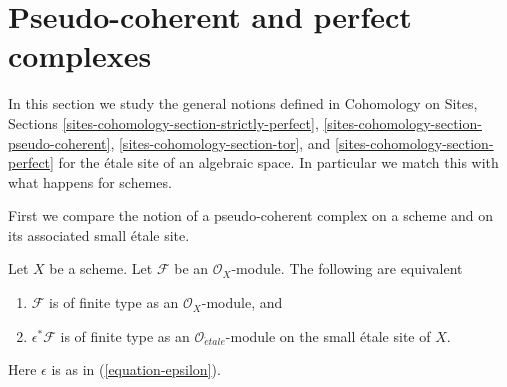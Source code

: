 \section{Pseudo-coherent and perfect complexes}
\label{section-spell-out}

\noindent
In this section we study the general notions defined in
Cohomology on Sites, Sections
\ref{sites-cohomology-section-strictly-perfect},
\ref{sites-cohomology-section-pseudo-coherent},
\ref{sites-cohomology-section-tor}, and
\ref{sites-cohomology-section-perfect}
for the \'etale site of an algebraic space. In particular we
match this with what happens for schemes.

\medskip\noindent
First we compare the notion of a pseudo-coherent complex on a
scheme and on its associated small \'etale site.

\begin{lemma}
\label{lemma-descend-finite-type}
Let $X$ be a scheme. Let $\mathcal{F}$ be an $\mathcal{O}_X$-module.
The following are equivalent
\begin{enumerate}
\item $\mathcal{F}$ is of finite type as an $\mathcal{O}_X$-module, and
\item $\epsilon^*\mathcal{F}$ is of finite type as an
$\mathcal{O}_{\acute{e}tale}$-module on the small \'etale site of $X$.
\end{enumerate}
Here $\epsilon$ is as in (\ref{equation-epsilon}).
\end{lemma}

